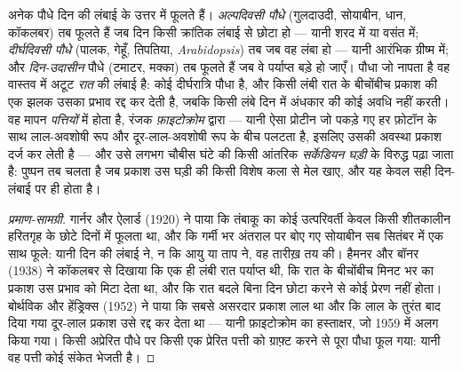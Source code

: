 \begin{proposition}[दीप्तिकालिता: पौधा रात नापता है]\label{prop:b2:plant-flowering:photoperiod}
अनेक पौधे दिन की लंबाई के उत्तर में फूलते हैं। \emph{अल्पदिवसी
पौधे} (गुलदाउदी, सोयाबीन, धान, कॉकलबर) तब फूलते हैं जब
दिन किसी क्रांतिक लंबाई से छोटा हो --- यानी शरद में या वसंत में;
\emph{दीर्घदिवसी पौधे} (पालक, गेहूँ, तिपतिया, \emph{Arabidopsis})
तब जब वह लंबा हो --- यानी आरंभिक ग्रीष्म में; और \emph{दिन-उदासीन} पौधे
(टमाटर, मक्का) तब फूलते हैं जब वे पर्याप्त बड़े हो जाएँ। पौधा जो नापता है
वह वास्तव में अटूट \emph{रात} की लंबाई है: कोई
 दीर्घरात्रि पौधा है, और किसी लंबी रात के
बीचोंबीच प्रकाश की एक झलक उसका प्रभाव रद्द कर देती है, जबकि किसी लंबे दिन
में अंधकार की कोई अवधि नहीं करती। वह मापन \emph{पत्तियों} में होता है,
रंजक \emph{फ़ाइटोक्रोम} द्वारा --- यानी ऐसा प्रोटीन जो पकड़े गए हर फ़ोटॉन
के साथ लाल-अवशोषी रूप और दूर-लाल-अवशोषी रूप के बीच पलटता है, इसलिए उसकी
अवस्था प्रकाश दर्ज कर लेती है --- और उसे लगभग चौबीस घंटे की किसी आंतरिक
\emph{सर्केडियन घड़ी} के विरुद्ध पढ़ा जाता है: पुष्पन तब चलता है जब प्रकाश
उस घड़ी की किसी विशेष कला से मेल खाए, और यह केवल सही
दिन-लंबाई पर ही होता है।
\end{proposition}
\begin{proof}[प्रमाण-सामग्री]
गार्नर और ऐलार्ड (1920) ने पाया कि तंबाकू का कोई उत्परिवर्ती केवल
किसी शीतकालीन हरितगृह के छोटे दिनों में फूलता था, और कि गर्मी भर
अंतराल पर बोए गए सोयाबीन सब सितंबर में एक साथ फूले: यानी दिन की लंबाई ने,
न कि आयु या ताप ने, वह तारीख़ तय की। हैमनर और बॉनर
(1938) ने कॉकलबर से दिखाया कि एक ही लंबी रात पर्याप्त थी, कि
रात के बीचोंबीच मिनट भर का प्रकाश उस प्रभाव को मिटा देता था,
और कि रात बदले बिना दिन छोटा करने से कोई प्रेरण नहीं होता। बोर्थविक और
हेंड्रिक्स (1952) ने पाया कि सबसे असरदार प्रकाश लाल था और कि लाल के
तुरंत बाद दिया गया दूर-लाल प्रकाश उसे रद्द कर देता था --- यानी फ़ाइटोक्रोम
का हस्ताक्षर, जो 1959 में अलग किया गया। किसी अप्रेरित पौधे पर किसी एक
प्रेरित पत्ती को ग्राफ़्ट करने से पूरा पौधा फूल गया: यानी वह पत्ती कोई संकेत भेजती है।
\end{proof}

